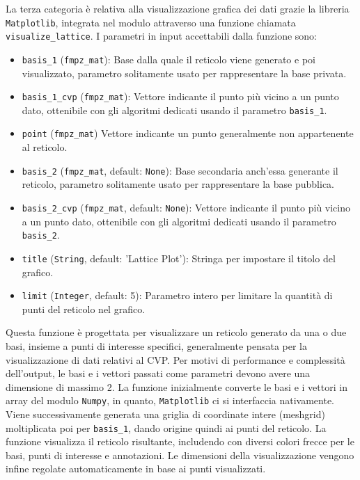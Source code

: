 La terza categoria è relativa alla visualizzazione grafica dei dati grazie la libreria
\texttt{Matplotlib}, integrata nel modulo attraverso una funzione chiamata 
\texttt{visualize\_lattice}. I parametri in input accettabili dalla funzione sono:
\begin{itemize}
    \item \texttt{basis\_1} (\texttt{fmpz\_mat}): 
    Base dalla quale il reticolo viene generato e poi visualizzato, parametro solitamente
    usato per rappresentare la base privata. 
    \item \texttt{basis\_1\_cvp} (\texttt{fmpz\_mat}): 
    Vettore indicante il punto più vicino a un punto dato, ottenibile con gli algoritmi 
    dedicati usando il parametro \texttt{basis\_1}. 
    \item \texttt{point} (\texttt{fmpz\_mat})
    Vettore indicante un punto generalmente non appartenente al reticolo.
    \item \texttt{basis\_2} (\texttt{fmpz\_mat}, default: \texttt{None}): 
    Base secondaria anch'essa generante il reticolo, parametro solitamente
    usato per rappresentare la base pubblica. 
    \item \texttt{basis\_2\_cvp} (\texttt{fmpz\_mat}, default: \texttt{None}): 
    Vettore indicante il punto più vicino a un punto dato, ottenibile con gli algoritmi 
    dedicati usando il parametro \texttt{basis\_2}. 
    \item \texttt{title} (\texttt{String}, default: 'Lattice Plot'): 
    Stringa per impostare il titolo del grafico. 
    \item \texttt{limit} (\texttt{Integer}, default: 5): 
    Parametro intero per limitare la quantità di punti del reticolo nel grafico. 
\end{itemize}

Questa funzione è progettata per visualizzare un reticolo generato da una o due basi, 
insieme a punti di interesse specifici, generalmente pensata per la visualizzazione di dati
relativi al CVP. Per motivi di performance e complessità dell'output, le basi e i vettori 
passati come parametri devono avere una dimensione di massimo 2. 
La funzione inizialmente converte le basi e i vettori in array del modulo 
\texttt{Numpy}, in quanto, \texttt{Matplotlib} ci si interfaccia nativamente. 
Viene successivamente generata una griglia di coordinate intere (meshgrid) moltiplicata poi 
per \texttt{basis\_1}, dando origine quindi ai punti del reticolo.
La funzione visualizza il reticolo risultante, includendo con diversi colori
frecce per le basi, punti di interesse e annotazioni. Le dimensioni della visualizzazione 
vengono infine regolate automaticamente in base ai punti visualizzati. 

